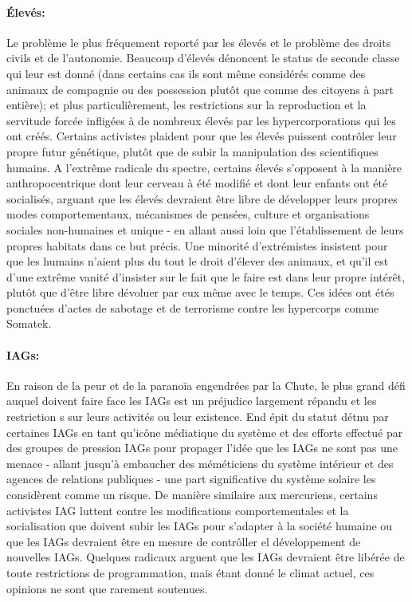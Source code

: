 \paragraph{Élevés:} Le problème le plus fréquement reporté par les élevés et le problème des droits civils et de l'autonomie. Beaucoup d'élevés dénoncent le status de seconde classe qui leur est donné (dans certains cas ils sont même considérés comme des animaux de compagnie ou des possession plutôt que comme des citoyens à part entière); et plus particulièrement, les restrictions sur la reproduction et la servitude forcée infligées à de nombreux élevés par les hypercorporations qui les ont créés. Certains activistes plaident pour que les élevés puissent contrôler leur propre futur génétique, plutôt que de subir la manipulation des scientifiques humains. A l'extrême radicale du spectre, certains élevés s'opposent à la manière anthropocentrique dont leur cerveau à été modifié et dont leur enfants ont été socialisés, arguant que les élevés devraient être libre de développer leurs propres modes comportementaux, mécanismes de pensées, culture et organisations sociales non-humaines et unique - en allant aussi loin que l'établissement de leurs propres habitats dans ce but précis. Une minorité d'extrémistes insistent pour que les humains n'aient plus du tout le droit d'élever des animaux, et qu'il est d'une extrême vanité d'insister sur le fait que le faire est dans leur propre intérêt, plutôt que d'être libre dévoluer par eux même avec le temps. Ces idées ont étés ponctuées d'actes de sabotage et de terrorisme contre les hypercorps comme Somatek. 

\paragraph{IAGs:} En raison de la peur et de la paranoïa engendrées par la Chute, le plus grand défi auquel doivent faire face les IAGs est un préjudice largement répandu et les restriction s sur leurs activités ou leur existence. End épit du statut détnu par certaines IAGs en tant qu'icône médiatique du système et des efforts effectué par des groupes de pression IAGs pour propager l'idée que les IAGs ne sont pas une menace - allant jusqu'à embaucher des méméticiens du système intérieur et des agences de relations publiques - une part significative du système solaire les considèrent comme un risque. De manière similaire aux mercuriens, certains activistes IAG luttent contre les modifications comportementales et la socialisation que doivent subir les IAGs pour s'adapter à la société humaine ou que les IAGs devraient être en mesure de contrôller el développement de nouvelles IAGs. Quelques radicaux arguent que les IAGs devraient être libérée de toute restrictions de programmation, mais étant donné le climat actuel, ces opinions ne sont que rarement soutenues. 

